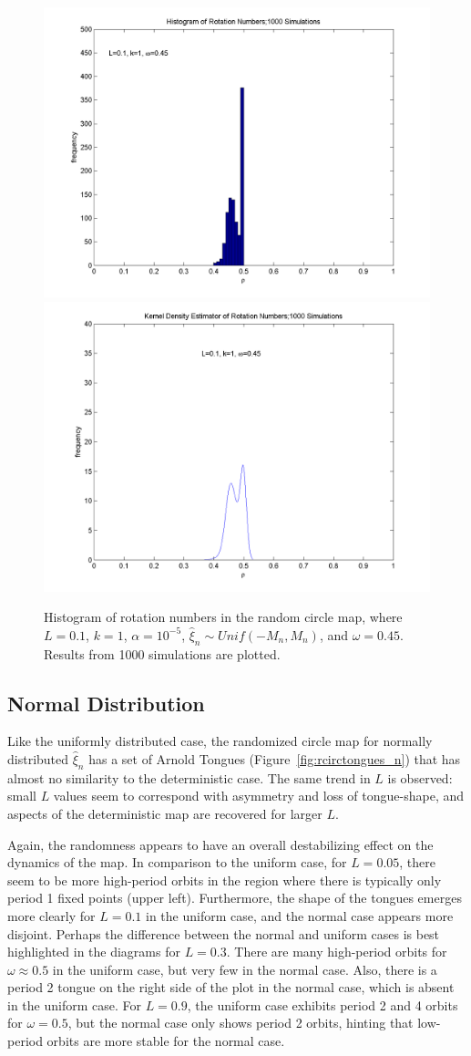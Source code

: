 \begin{figure}[H]\linespread{1}
\caption[Histogram and kernel density estimator of rotation numbers in the random circle
map, $\alpha = 10^{-5}$]{Histogram of rotation numbers in the random circle map, where
  $L=0.1$, $k=1$, $\alpha = 10^{-5}$, $\hat{\xi}_n\sim
  Unif(-M_n,M_n)$, and $\omega = 0.45$. Results from 1000 simulations
  are plotted.}\label{fig:kde1_u}
\centering
\includegraphics[width=.5\textwidth]{figs/hist_rho_k1_L01_om045.png}\hfill
\includegraphics[width=.5\textwidth]{figs/kde_rho_k1_L01_om045.png}
\end{figure}

\subsection{Normal Distribution}
Like the uniformly distributed case, the randomized circle map for normally distributed $\hat{\xi}_n$ has a set of Arnold Tongues (Figure~\ref{fig:rcirctongues_n}) that has almost no similarity to the deterministic
case. The same trend in $L$ is observed: small $L$ values seem to correspond
with asymmetry and loss of tongue-shape, and aspects of the
deterministic map are recovered for larger $L$. 

Again, the randomness appears to have an overall destabilizing effect on the dynamics of the
map. In comparison to the uniform case, for $L=0.05$, there seem to be
more high-period orbits in the region where there is typically only
period 1 fixed points (upper left). Furthermore, the shape of the
tongues emerges more clearly for $L=0.1$ in the uniform case, and the
normal case appears more disjoint. Perhaps the difference between the
normal and uniform cases is best highlighted in the diagrams for
$L=0.3$. There are many high-period orbits for $\omega \approx 0.5$ in
the uniform case, but very few in the normal case. Also, there is a period
2 tongue on the right side of the plot in the normal case, which is
absent in the uniform case. For $L=0.9$, the uniform case exhibits period 2 and 4 orbits
for $\omega=0.5$, but the normal case only shows period 2 orbits, hinting that low-period orbits are more stable for the normal case. 

